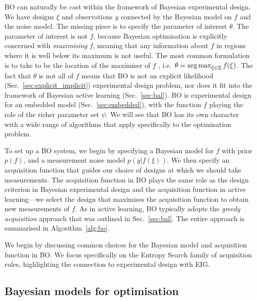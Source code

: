 \documentclass[a4paper, 10pt]{report}
\theoremstyle{plain}
\begin{document}
	BO can naturally be cast within the framework of Bayesian experimental design.
	We have designs $\xi$ and observations $y$ connected by the Bayesian model on $f$ and the noise model.
	The missing piece is to specify the parameter of interest $\theta$.
	The parameter of interest is not $f$, because Bayesian optimisation is explicitly concerned with \emph{maximising} $f$, meaning that any information about $f$ in regions where it is well below its maximum is not useful.
	The most common formulation is to take to be the location of the maximiser of $f$ \citep{hernandez2014}, i.e.~$\theta = \operatorname*{arg\,max}_{\xi\in\Xi} f(\xi)$.
	The fact that $\theta$ is not all of $f$ means that BO is not an explicit likelihood (Sec.~\ref{sec:explicit_implicit}) experimental design problem, nor does it fit into the framework of Bayesian active learning (Sec.~\ref{sec:bal}). 
	BO is experimental design for an embedded model (Sec.~\ref{sec:embedded}), with the function $f$ playing the role of the richer parameter set $\psi$. We will see that BO has its own character with a wide range of algorithms that apply specifically to the optimisation problem.
	
	To set up a BO system, we begin by specifying a Bayesian model for $f$ with prior $p(f)$, and a measurement noise model $p(y|f(\xi))$.
	We then specify an acquisition function that guides our choice of designs at which we should take measurements.
	The acquisition function in BO plays the same role as the design criterion in Bayesian experimental design and the acquisition function in active learning---we select the design that maximises the acquisition function to obtain new measurements of $f$.
	As in active learning, BO typically adopts the \emph{greedy acquisition} approach that was outlined in Sec.~\ref{sec:bal}.
	The entire approach is summarised in Algorithm~\ref{alg:bo}.
	
	We begin by discussing common choices for the Bayesian model and acquisition function in BO.
	We focus specifically on the Entropy Search family of acquisition rules, highlighting the connection to experimental design with EIG.
	
	
	
	\subsection{Bayesian models for optimisation}
\end{document}
